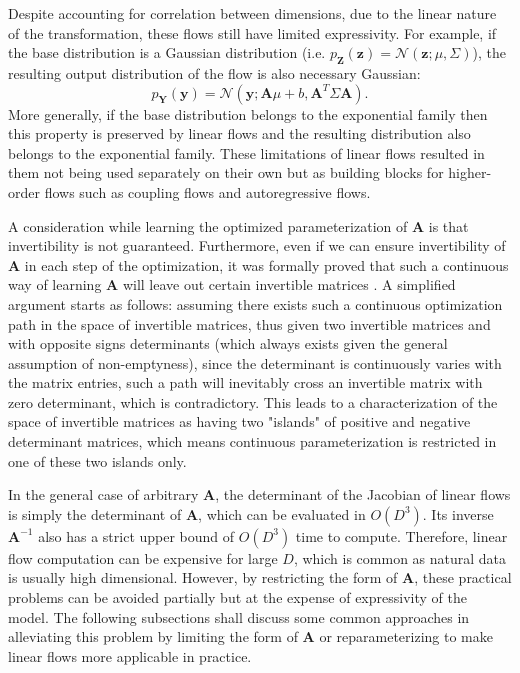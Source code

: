 Despite accounting for correlation between dimensions, due to the linear nature
of the transformation, these flows still have limited expressivity. For example, if the base
distribution is a Gaussian distribution (i.e. $p_{\mathbf{Z}}(\mathbf{z}) =
\mathcal{N}(\mathbf{z}; \mu, \Sigma)$), the resulting output distribution of the
flow is also necessary Gaussian:
$$
p_{\mathbf{Y}}(\mathbf{y}) = \mathcal{N}(\mathbf{y}; \mathbf{A}\mu + b, \mathbf{A}^T \Sigma
\mathbf{A})
.$$
More generally, if the base distribution belongs to the exponential family then
this property is preserved by linear flows and the resulting distribution also
belongs to the exponential family. These limitations of linear flows resulted in
them not being used separately on their own but as building blocks for
higher-order flows such as coupling flows and autoregressive flows.

A consideration while learning the optimized parameterization of $\mathbf{A}$ is
that invertibility is not guaranteed. Furthermore, even if we can ensure
invertibility of $\mathbf{A}$ in each step of the optimization, it was formally
proved that such a continuous way of learning $\mathbf{A}$ will leave out
certain invertible matrices
\citep{papamakariosNormalizingFlowsProbabilistic2021}. A simplified argument
starts as follows: assuming there exists such a continuous optimization path in
the space of invertible matrices, thus given two invertible matrices and with
opposite signs determinants (which always exists given the general assumption of
non-emptyness), since the determinant is continuously varies with the matrix
entries, such a path will inevitably cross an invertible matrix with zero
determinant, which is contradictory. This leads to a characterization of the
space of invertible matrices as having two "islands" of positive and negative
determinant matrices, which means continuous parameterization is restricted in
one of these two islands only.

In the general case of arbitrary $\textbf{A}$, the determinant of the Jacobian
of linear flows is simply the determinant of $\mathbf{A}$, which can be
evaluated in $O(D^3)$. Its inverse $\mathbf{A}^{-1}$ also has a strict upper
bound of $O(D^3)$ time to compute. Therefore, linear flow computation can be
expensive for large $D$, which is common as natural data is usually high
dimensional. However, by restricting the form of $\textbf{A}$, these practical
problems can be avoided partially but at the expense of expressivity of the
model. The following subsections shall discuss some common approaches in
alleviating this problem by limiting the form of $\mathbf{A}$ or
reparameterizing to make linear flows more applicable in practice.

